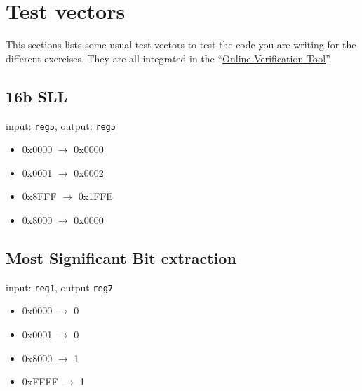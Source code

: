 \documentclass[10pt,a4paper]{article}
\theoremstyle{definition}%
\newcommand{\ovt}{\href{https://risc16.weegee.fr}{Online Verification Tool}}
\begin{document}
\newpage

\section{Test vectors}
\label{sec:vectors}
This sections lists some usual test vectors to test the code you are writing for the different exercises. They are all integrated in the ``\ovt''.
\subsection{16b SLL}
input: \verb!reg5!, output: \verb!reg5!
{\ttfamily
\begin{itemize}
\item 0x0000 $\longrightarrow$ 0x0000
\item 0x0001 $\longrightarrow$ 0x0002
\item 0x8FFF $\longrightarrow$ 0x1FFE
\item 0x8000 $\longrightarrow$ 0x0000
\end{itemize}}
\subsection{Most Significant Bit extraction}
input: \verb!reg1!, output \verb!reg7!
{\ttfamily
\begin{itemize}
\item 0x0000  $\longrightarrow$ 0
\item 0x0001  $\longrightarrow$ 0
\item 0x8000 $\longrightarrow$ 1
\item 0xFFFF $\longrightarrow$ 1
\end{itemize}}
\end{document}
